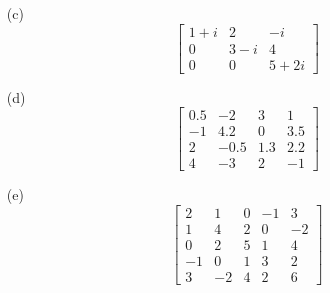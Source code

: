 \documentclass[a4paper,11pt]{article}
\theoremstyle{definition}
\begin{document}
\begin{enumerate}[(1)]
\begin{multicols}{2}
\begin{enumerate}
    \item[(c)] 
    \[
    \begin{bmatrix}
    1+i & 2 & -i \\
    0 & 3-i & 4 \\
    0 & 0 & 5+2i
    \end{bmatrix}
    \]
    \end{enumerate}
    \columnbreak
    \begin{enumerate}
    \item[(d)]
    \[
    \begin{bmatrix}
    0.5 & -2 & 3 & 1 \\
    -1 & 4.2 & 0 & 3.5 \\
    2 & -0.5 & 1.3 & 2.2 \\
    4 & -3 & 2 & -1
    \end{bmatrix}
    \]
    
    \item[(e)]
    \[
    \begin{bmatrix}
    2 & 1 & 0 & -1 & 3 \\
    1 & 4 & 2 & 0 & -2 \\
    0 & 2 & 5 & 1 & 4 \\
    -1 & 0 & 1 & 3 & 2 \\
    3 & -2 & 4 & 2 & 6
    \end{bmatrix}
    \]
    \end{enumerate}
    \end{multicols}
    

\end{enumerate}
\end{document}
